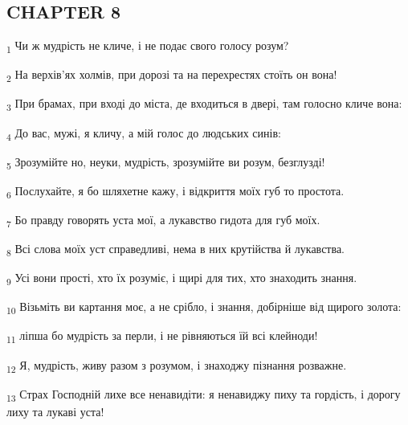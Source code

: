 \subsection{CHAPTER 8}
\begin{tcolorbox}
\textsubscript{1} Чи ж мудрість не кличе, і не подає свого голосу розум?
\end{tcolorbox}
\begin{tcolorbox}
\textsubscript{2} На верхів'ях холмів, при дорозі та на перехрестях стоїть он вона!
\end{tcolorbox}
\begin{tcolorbox}
\textsubscript{3} При брамах, при вході до міста, де входиться в двері, там голосно кличе вона:
\end{tcolorbox}
\begin{tcolorbox}
\textsubscript{4} До вас, мужі, я кличу, а мій голос до людських синів:
\end{tcolorbox}
\begin{tcolorbox}
\textsubscript{5} Зрозумійте но, неуки, мудрість, зрозумійте ви розум, безглузді!
\end{tcolorbox}
\begin{tcolorbox}
\textsubscript{6} Послухайте, я бо шляхетне кажу, і відкриття моїх губ то простота.
\end{tcolorbox}
\begin{tcolorbox}
\textsubscript{7} Бо правду говорять уста мої, а лукавство гидота для губ моїх.
\end{tcolorbox}
\begin{tcolorbox}
\textsubscript{8} Всі слова моїх уст справедливі, нема в них крутійства й лукавства.
\end{tcolorbox}
\begin{tcolorbox}
\textsubscript{9} Усі вони прості, хто їх розуміє, і щирі для тих, хто знаходить знання.
\end{tcolorbox}
\begin{tcolorbox}
\textsubscript{10} Візьміть ви картання моє, а не срібло, і знання, добірніше від щирого золота:
\end{tcolorbox}
\begin{tcolorbox}
\textsubscript{11} ліпша бо мудрість за перли, і не рівняються їй всі клейноди!
\end{tcolorbox}
\begin{tcolorbox}
\textsubscript{12} Я, мудрість, живу разом з розумом, і знаходжу пізнання розважне.
\end{tcolorbox}
\begin{tcolorbox}
\textsubscript{13} Страх Господній лихе все ненавидіти: я ненавиджу пиху та гордість, і дорогу лиху та лукаві уста!
\end{tcolorbox}
